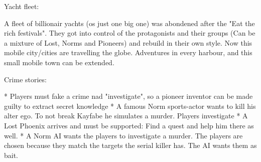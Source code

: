 Yacht fleet:

A fleet of billionair yachts (os just one big one) was abondened after the "Eat the rich festivals". They got into control of the protagonists and their groups (Can be a mixture of Lost, Norms and Pioneers) and rebuild in their own style. Now this mobile city/cities are travelling the globe. Adventures in every harbour, and this small mobile town can be extended.


Crime stories:

* Players must fake a crime nad "investigate", so a pioneer inventor can be made guilty to extract secret knowledge
* A famous Norm sports-actor wants to kill his alter ego. To not break Kayfabe he simulates a murder. Players investigate
* A Lost Phoenix arrives and must be supported: Find a quest and help him there as well.
* A Norm AI wants the players to investigate a murder. The players are chosen because they match the targets the serial killer has. The AI wants them as bait.

